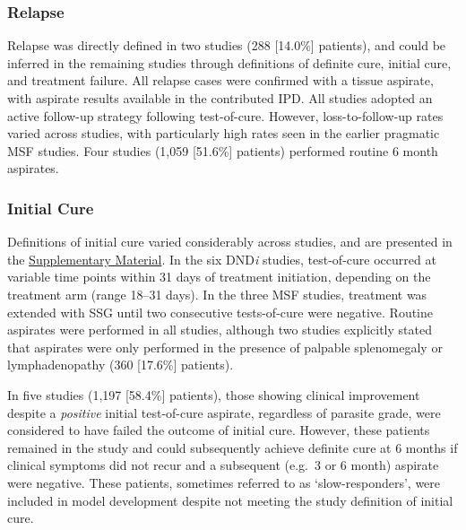 \subsubsection{Relapse}

Relapse was directly defined in two studies (288 [14.0\%] patients)\cite{ritmeijer2006,musa2010}, and could be inferred in the remaining studies through definitions of definite cure, initial cure, and treatment failure. All relapse cases were confirmed with a tissue aspirate, with aspirate results available in the contributed IPD. All studies adopted an active follow-up strategy following test-of-cure. However, loss-to-follow-up rates varied across studies, with particularly high rates seen in the earlier pragmatic MSF studies\cite{veeken2000,ritmeijer2006,ritmeijer2001}. Four studies (1,059 [51.6\%] patients)\cite{hailu2010,khalil2014,musa2010,musa2012} performed routine 6 month aspirates.

\subsubsection{Initial Cure\label{sec:ea_initial_cure}}

Definitions of initial cure varied considerably across studies, and are presented in the \href{https://github.com/jpwil/dphil}{Supplementary Material}. In the six DND\textit{i} studies, test-of-cure occurred at variable time points within 31 days of treatment initiation, depending on the treatment arm (range 18--31 days)\cite{hailu2010,mbui2019,musa2010,musa2012,wasunna2016,khalil2014}. In the three MSF studies, treatment was extended with SSG until two consecutive tests-of-cure were negative\cite{veeken2000,ritmeijer2006,ritmeijer2001}. Routine aspirates were performed in all studies, although two studies explicitly stated that aspirates were only performed in the presence of palpable splenomegaly or lymphadenopathy (360 [17.6\%] patients)\cite{ritmeijer2006,ritmeijer2001}.

In five studies (1,197 [58.4\%] patients), those showing clinical improvement despite a \textit{positive} initial test-of-cure aspirate, regardless of parasite grade, were considered to have failed the outcome of initial cure\cite{wasunna2016,musa2012,musa2010,khalil2014,hailu2010}. However, these patients remained in the study and could subsequently achieve definite cure at 6 months if clinical symptoms did not recur and a subsequent (e.g.\ 3 or 6 month) aspirate were negative. These patients, sometimes referred to as `slow-responders', were included in model development despite not meeting the study definition of initial cure.

